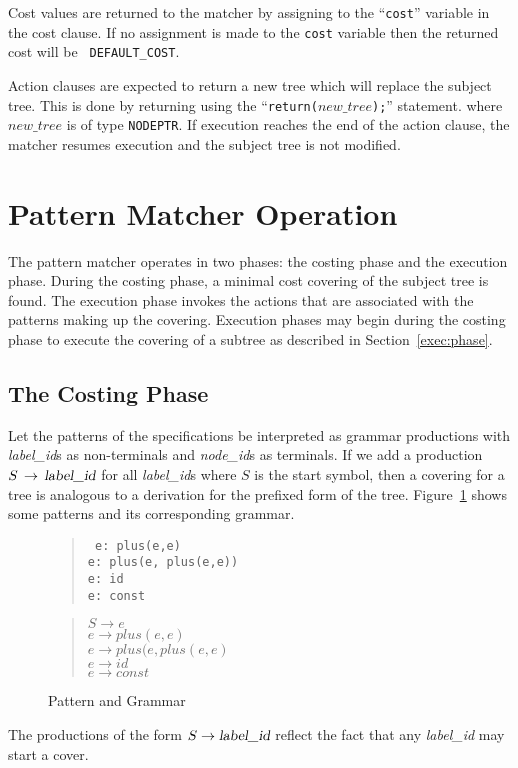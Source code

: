 Cost values are returned to the matcher by assigning to
the ``{\tt cost}'' variable in the cost clause.  If no assignment is
made to the {\tt cost} variable then the returned cost will be {\tt
DEFAULT\_COST}.

Action clauses are expected to return a new tree which will replace
the subject tree.  This is done by returning using the
``{\tt return($new\_tree$);}'' statement.
where {\tt $new\_tree$} is of type
{\tt NODEPTR}.
If execution reaches the end of the action clause, the
matcher resumes execution and the subject tree is not modified.

\section{Pattern Matcher Operation}
\label{pattern}

The
pattern matcher operates in two phases: the costing phase and the execution
phase.
During
the costing phase, a minimal cost covering of the subject tree is found.
The execution phase invokes the actions that are associated with the patterns
making up the covering.  Execution phases may begin during the costing phase
to execute the covering of a subtree as described in Section~\ref{exec:phase}.

\subsection{The Costing Phase}
\label{cost:phase}

Let the patterns of the \twiglang{} specifications be interpreted as grammar
productions with {\sl label\_id}s as non-terminals and {\sl node\_id}s
as terminals.
If we add a production
$S\,\to\,\hbox{\sl label\_id}$ for all {\sl label\_id}s where $S$ is the
start symbol,
then a covering for a tree is analogous to a derivation
for the prefixed form of the tree.
Figure~\ref{gram:interp} shows some patterns and its corresponding grammar.
\begin{figure}
\begin{center}
\begin{verse}
\tt
e: plus(e,e)\\
e: plus(e, plus(e,e))\\
e: id\\
e: const\\
\end{verse}
\end{center}
\vspace{0.3in}
\begin{center}\begin{verse}
$S\to e$\\
$e\to plus(e,e)$\\
$e\to plus(e,plus(e,e)$\\
$e\to id$\\
$e\to const$\\
\end{verse}\end{center}
\caption{Pattern and Grammar}
\label{gram:interp}
\end{figure}
The productions of the form $S\to\hbox{\sl label\_id}$ reflect the fact that
any {\sl label\_id} may start a cover.

